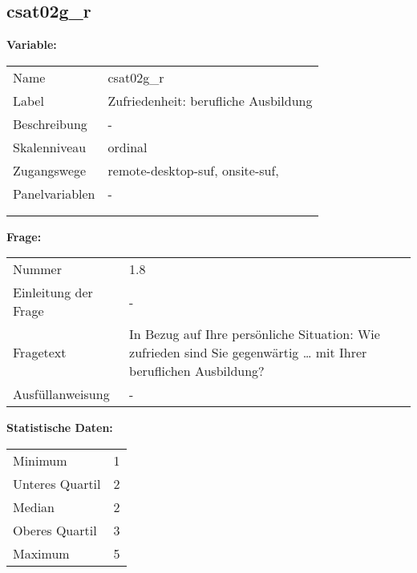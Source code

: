 	
	
	\subsection{csat02g\_r}
	\label{subSection:csat02g_r}

	\noindent\textbf{Variable:}\\
		\begin{tabular}{lL{11.3cm}}
			\label{tableVariable:csat02g_r}
			Name & csat02g\_r \\
			Label & Zufriedenheit: berufliche Ausbildung \\
			Beschreibung & - \\
			Skalenniveau & ordinal \\
			Zugangswege &
				remote-desktop-suf,
				onsite-suf,
 \\
			Panelvariablen & -
			 \\
			 \\
 \\
		\end{tabular}

		\vspace*{1 cm}
		\noindent\textbf{Frage:}\\
		\begin{tabular}{lL{11.3cm}}
			\label{tableQuestion:csat02g_r}
			Nummer & 1.8 \\
			Einleitung der Frage & - \\
			Fragetext & In Bezug auf Ihre persönliche Situation: Wie zufrieden sind Sie gegenwärtig …
mit Ihrer beruflichen Ausbildung? \\
			Ausfüllanweisung & - \\
		\end{tabular}


		\vspace*{1 cm}
		\noindent\textbf{Statistische Daten:}\\
			\begin{tabular}{ll}
				\label{tableStatistics:csat02g_r}
					Minimum & 1 \\
					Unteres Quartil & 2 \\
					Median & 2 \\
					Oberes Quartil & 3 \\
					Maximum & 5 \\
			\end{tabular}



